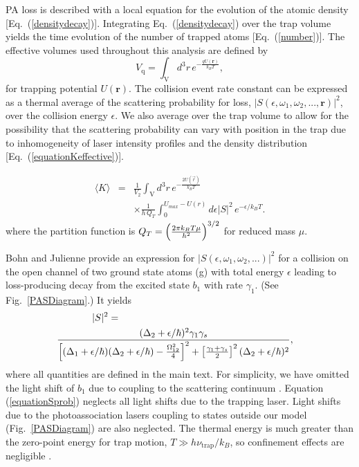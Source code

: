 PA loss is described with a local equation for the evolution of the atomic density [Eq.~(\ref{densitydecay})]. Integrating Eq.~(\ref{densitydecay}) over the trap volume yields the time evolution of the number of trapped atoms [Eq.~(\ref{number})]. The effective volumes used throughout this analysis are defined by
\begin{equation}\label{eq:effectivevolumes}
	V_{\text{q}}=\int_{\mathrm{V}} d^3r \, e^{-\frac{qU(\mathbf{r})}{k_{B}T}},
\end{equation}
for trapping potential $U(\mathbf{r})$. The collision event rate constant can be expressed as a thermal average of the scattering probability for loss, $\vert S(\epsilon,\omega_1,\omega_2,...,\mathbf{r})\vert^2$, over the collision energy $\epsilon$. We also average over the trap volume to allow for the possibility that the scattering probability can vary with position in the trap due to inhomogeneity of laser intensity profiles and the density distribution [Eq.~(\ref{equationKeffective})].

\begin{eqnarray} \label{equationKeffective}
  \langle K \rangle&=& \frac{1}{V_{2}}\int_{\mathrm{V}}
d^3r \,
          e^{-\frac{2U(\vec{r})}{k_{B}T}} \nonumber \\
         &&\times \frac{1}{h\,Q_{T}}
\int_{0}^{U_{max}-U(r)}d\epsilon \vert S\vert^2
   \,e^{-\epsilon/k_{B}T}.
\end{eqnarray}
where the partition function is $Q_{T}=\left({2\pi k_{B}T \mu \over
h^2}\right) ^{3/2}$ for reduced mass $\mu$.


Bohn and Julienne \cite{bju96} provide an expression for $\vert S(\epsilon,\omega_1,\omega_2,...)\vert^2$ for a collision on the open channel of two ground state atoms (g) with total energy $\epsilon$ leading to loss-producing decay from the excited state $b_1$ with rate $\gamma_1$. (See Fig.\ \ref{PASDiagram}.) It yields
\begin{eqnarray}\label{equationSprob}
  \vert S\vert^2 =   \hspace{2.5in}&&\\
  {(\Delta_2+\epsilon/\hbar)^2{\gamma}_1{\gamma}_s \over
  	\left[(\Delta_1+\epsilon/\hbar)(\Delta_2+\epsilon/\hbar)-\frac{\Omega_{12}^{2}}{4}\right]^2+\left[ \frac{\gamma_1+\gamma_s}{2}\right]^2(\Delta_2+		 	\epsilon/\hbar)^2}, &&\nonumber
\end{eqnarray}
where all quantities are defined in the main text. For simplicity, we have omitted the light shift of $b_1$ due to coupling to the scattering continuum \cite{bju99}. Equation (\ref{equationSprob}) neglects all light shifts due to the trapping laser. Light shifts due to the photoassociation lasers coupling to states outside our model (Fig.\ \ref{PASDiagram}) are also neglected. The thermal energy is much greater than the zero-point energy for trap motion, $T\gg h\nu_{\text{trap}}/k_B$, so confinement effects are negligible \cite{zbl06}.

